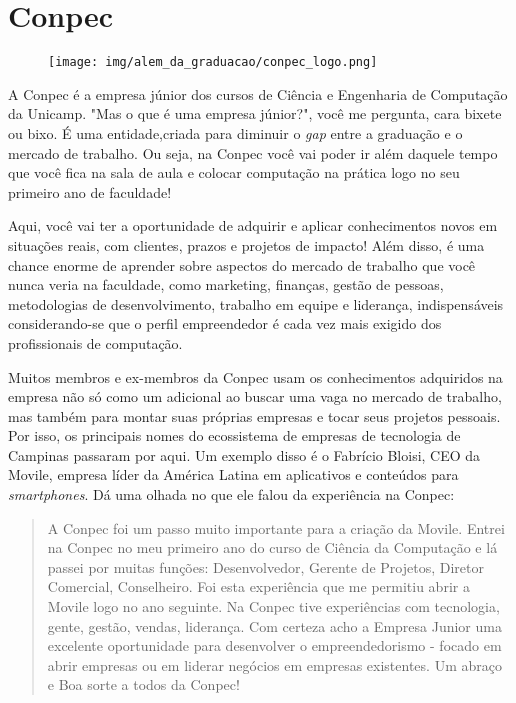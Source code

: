 
\section{Conpec}

\begin{figure}[H]
    \centering
    \texttt{[image: img/alem\_da\_graduacao/conpec\_logo.png]}
\end{figure}

A Conpec é a empresa júnior dos cursos de Ciência e Engenharia de Computação da
Unicamp. "Mas o que é uma empresa júnior?", você me pergunta, cara bixete ou bixo. 
É uma entidade,criada para diminuir o \textit{gap} entre a graduação e o mercado
de trabalho.
Ou seja, na Conpec você vai poder ir além daquele tempo que você fica na sala 
de aula e colocar computação na prática logo no seu primeiro ano de faculdade!

Aqui, você vai ter a oportunidade de adquirir e aplicar conhecimentos novos em 
situações reais, com clientes, prazos e projetos de impacto! Além disso, é uma 
chance enorme de aprender sobre aspectos do mercado de trabalho que você nunca 
veria na faculdade, como marketing, finanças, gestão de pessoas, metodologias de
desenvolvimento, trabalho em equipe e liderança, indispensáveis considerando-se que
o perfil empreendedor é cada vez mais exigido dos profissionais de computação.

Muitos membros e ex-membros da Conpec usam os conhecimentos adquiridos na
empresa não só como um adicional ao buscar uma vaga no mercado de trabalho, mas
também para montar suas próprias empresas e tocar seus projetos pessoais. Por isso,
os principais nomes do ecossistema de empresas de tecnologia de Campinas passaram por
aqui. Um exemplo disso é o Fabrício Bloisi, CEO da Movile, empresa líder da América Latina
em aplicativos e conteúdos para \textit{smartphones}. Dá uma olhada no que ele falou da
experiência na Conpec:
\begin{quote}
A Conpec foi um passo muito importante para a criação da Movile. Entrei na Conpec no 
meu primeiro ano do curso de Ciência da Computação e lá passei por muitas funções: 
Desenvolvedor, Gerente de Projetos, Diretor Comercial, Conselheiro. Foi esta experiência 
que me permitiu abrir a Movile logo no ano seguinte. Na Conpec tive experiências com 
tecnologia, gente, gestão, vendas, liderança. Com certeza acho a Empresa Junior uma excelente 
oportunidade para desenvolver o empreendedorismo - focado em abrir empresas ou em liderar 
negócios em empresas existentes. Um abraço e Boa sorte a todos da Conpec!
\end{quote}

